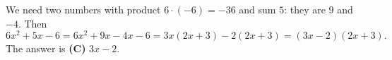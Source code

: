 We need two numbers with product $6\cdot(-6)=-36$ and sum $5$: they are $9$ and $-4$. Then
\[
6x^2+5x-6=6x^2+9x-4x-6=3x(2x+3)-2(2x+3)=(3x-2)(2x+3).
\]
The answer is \textbf{(C)} $3x-2$.
